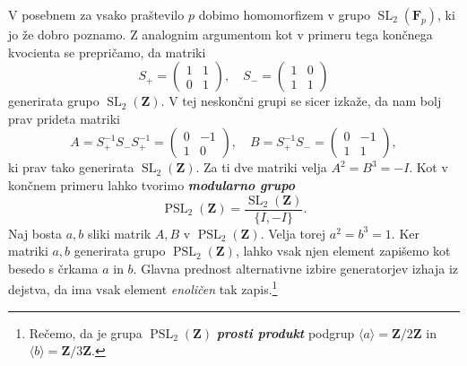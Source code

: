 \documentclass[11pt]{book}
\def\ZZ{\mathbf{Z}}
\def\FF{\mathbf{F}}
\DeclareMathOperator\SL{SL}
\DeclareMathOperator\PSL{PSL}
\def\definicija{\color{rdeca}\bf\em}
\theoremstyle{definition}
\theoremstyle{zgled}
\theoremstyle{odprtproblem}
\theoremstyle{domacanaloga}
\theoremstyle{izrek}
\begin{document}
V posebnem za vsako praštevilo $p$ dobimo homomorfizem v grupo $\SL_2(\FF_p)$, ki jo že dobro poznamo. Z analognim argumentom kot v primeru tega končnega kvocienta se prepričamo, da matriki
\[
    S_+ = \begin{pmatrix}
        1 & 1 \\ 0 & 1
    \end{pmatrix},
    \quad
    S_- = \begin{pmatrix}
        1 & 0 \\ 1 & 1
    \end{pmatrix}
\]
generirata grupo $\SL_2(\ZZ)$. V tej neskončni grupi se sicer izkaže, da nam bolj prav prideta matriki
\[
    A = S_+^{-1} S_- S_+^{-1} = \begin{pmatrix}
        0 & -1 \\ 1 & 0
    \end{pmatrix},
    \quad
    B = S_+^{-1} S_- = \begin{pmatrix}
        0 & -1 \\
        1 & 1
    \end{pmatrix},
\]
ki prav tako generirata $\SL_2(\ZZ)$. Za ti dve matriki velja $A^2 = B^3 = -I$. Kot v končnem primeru lahko tvorimo {\definicija modularno grupo}
\[
    {\textstyle \PSL_2(\ZZ)} = \frac{\SL_2(\ZZ)}{\{ I, -I \}}.
\]
Naj bosta $a,b$ sliki matrik $A,B$ v $\PSL_2(\ZZ)$. Velja torej $a^2 = b^3 = 1$. Ker matriki $a,b$ generirata grupo $\PSL_2(\ZZ)$, lahko vsak njen element zapišemo kot besedo s črkama $a$ in $b$. Glavna prednost alternativne izbire generatorjev izhaja iz dejstva, da ima vsak element \emph{enoličen} tak zapis.\footnote{Rečemo, da je grupa $\PSL_2(\ZZ)$ {\definicija prosti produkt} podgrup $\langle a \rangle = \ZZ/2\ZZ$ in $\langle b \rangle = \ZZ/3\ZZ$.}
\end{document}
